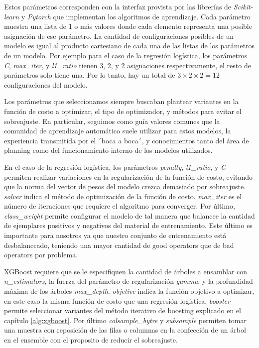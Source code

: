 Estos parámetros corresponden con la interfaz provista por las librerías de
\emph{Scikit-learn} y \emph{Pytorch} que implementan los algoritmos de
aprendizaje. Cada parámetro muestra una lista de 1 o más valores donde cada
elemento representa una posible asignación de ese parámetro. La cantidad de
configuraciones posibles de un modelo es igual al producto cartesiano de cada
una de las listas de los parámetros de un modelo. Por ejemplo para el caso de la
regresión logística, los parámetros \emph{C}, \emph{max\_iter}, y
\emph{l1\_ratio} tienen 3, 2, y 2 asignaciones respectivamente, el resto de
parámetros solo tiene una. Por lo tanto, hay un total de $3 \times 2 \times 2 =
12$ configuraciones del modelo.

Los parámetros que seleccionamos siempre buscaban plantear variantes en la
función de costo a optimizar, el tipo de optimizador, y métodos para evitar el
sobreajuste. En particular, seguimos como guía valores comunes que la comunidad
de aprendizaje automático suele utilizar para estos modelos,  la experiencia
transmitida por el ´boca a boca´, y conocimientos tanto del área de planning
como del funcionamiento interno de los modelos utilizados. 

En el caso de la regresión logística, los parámetros \emph{penalty},
\emph{l1\_ratio}, y \emph{C} permiten realizar variaciones en la regularización
de la función de costo, evitando que la norma del vector de pesos del modelo
crezca demasiado por sobreajuste. \emph{solver} indica el método de optimización
de la función de costo. \emph{max\_iter} es el número de iteraciones que
requiere el algoritmo para converger. Por último, \emph{class\_weight} permite
configurar el modelo de tal manera que balancee la cantidad de ejemplares
positivos y negativos del material de entrenamiento. Este último es importante
para nosotros ya que nuestro conjunto de entrenamiento está desbalanceado,
teniendo una mayor cantidad de good operators que de bad operators por problema.

XGBoost requiere que se le especifiquen la cantidad de árboles a ensamblar con
\emph{n\_estimators}, la fuerza del parámetro de regularización \emph{gamma}, y
la profundidad máxima de los árboles \emph{max\_depth}. \emph{objetive} indica
la función objetivo a optimizar, en este caso la misma función de costo que una
regresión logística. \emph{booster} permite seleccionar variantes del método
iterativo de boosting explicado en el capítulo \ref{alg:xgboost}. Por último
\emph{colsample\_bytre} y \emph{subsample} permiten tomar una muestra con
reposición de las filas o columnas en la confección de un árbol en el ensemble
con el proposito de reducir el sobreajuste.

